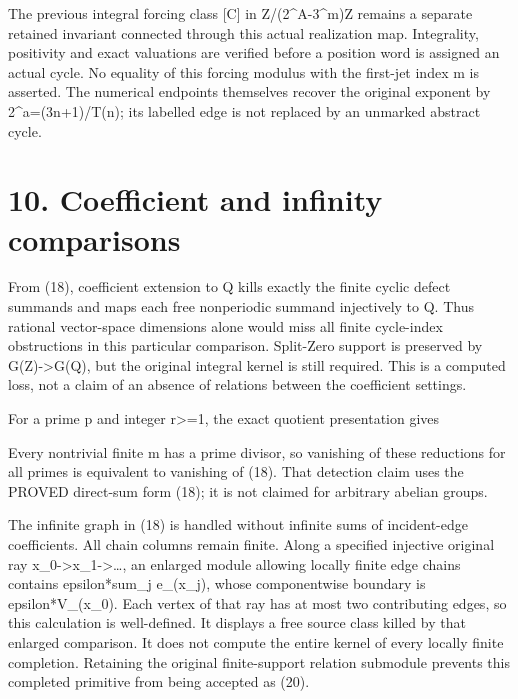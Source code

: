 The previous integral forcing class {[}C{]} in Z/(2\^{}A-3\^{}m)Z
remains a separate retained invariant connected through this actual
realization map. Integrality, positivity and exact valuations are
verified before a position word is assigned an actual cycle. No equality
of this forcing modulus with the first-jet index m is asserted. The
numerical endpoints themselves recover the original exponent by
2\^{}a=(3n+1)/T(n); its labelled edge is not replaced by an unmarked
abstract cycle.

\section{10. Coefficient and infinity comparisons}

From (18), coefficient extension to Q kills exactly the finite cyclic
defect summands and maps each free nonperiodic summand injectively to Q.
Thus rational vector-space dimensions alone would miss all finite
cycle-index obstructions in this particular comparison. Split-Zero
support is preserved by G(Z)-\textgreater G(Q), but the original
integral kernel is still required. This is a computed loss, not a claim
of an absence of relations between the coefficient settings.

For a prime p and integer r\textgreater=1, the exact quotient
presentation gives


Every nontrivial finite m has a prime divisor, so vanishing of these
reductions for all primes is equivalent to vanishing of (18). That
detection claim uses the PROVED direct-sum form (18); it is not claimed
for arbitrary abelian groups.

The infinite graph in (18) is handled without infinite sums of
incident-edge coefficients. All chain columns remain finite. Along a
specified injective original ray
x\_0-\textgreater x\_1-\textgreater\ldots, an enlarged module allowing
locally finite edge chains contains epsilon*sum\_j e\_(x\_j), whose
componentwise boundary is epsilon*V\_(x\_0). Each vertex of that ray has
at most two contributing edges, so this calculation is well-defined. It
displays a free source class killed by that enlarged comparison. It does
not compute the entire kernel of every locally finite completion.
Retaining the original finite-support relation submodule prevents this
completed primitive from being accepted as (20).


